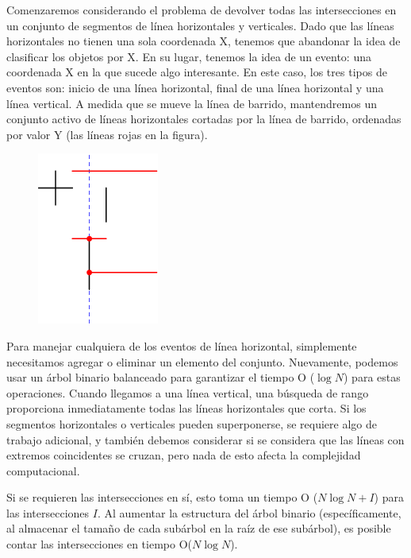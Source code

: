 Comenzaremos considerando el problema de devolver todas las intersecciones en un conjunto de segmentos de línea horizontales y verticales. Dado que las líneas horizontales no tienen una sola coordenada X, tenemos que abandonar la idea de clasificar los objetos por X. En su lugar, tenemos la idea de un evento: una coordenada X en la que sucede algo interesante. En este caso, los tres tipos de eventos son: inicio de una línea horizontal, final de una línea horizontal y una línea vertical. A medida que se mueve la línea de barrido, mantendremos un conjunto activo de líneas horizontales cortadas por la línea de barrido, ordenadas por valor Y (las líneas rojas en la figura).

\begin{figure}[h!]
	\centering
	\includegraphics[width=0.2\linewidth]{img/linesvh}
	\label{fig:linesvh}
\end{figure}

Para manejar cualquiera de los eventos de línea horizontal, simplemente necesitamos agregar o eliminar un elemento del conjunto. Nuevamente, podemos usar un árbol binario balanceado para garantizar el tiempo O ($\log N$) para estas operaciones. Cuando llegamos a una línea vertical, una búsqueda de rango proporciona inmediatamente todas las líneas horizontales que corta. Si los segmentos horizontales o verticales pueden superponerse, se requiere algo de trabajo adicional, y también debemos considerar si se considera que las líneas con extremos coincidentes se cruzan, pero nada de esto afecta la complejidad computacional.

Si se requieren las intersecciones en sí, esto toma un tiempo O ($N \log N + I$) para las intersecciones $I$. Al aumentar la estructura del árbol binario (específicamente, al almacenar el tamaño de cada subárbol en la raíz de ese subárbol), es posible contar las intersecciones en tiempo O($N \log N$).

